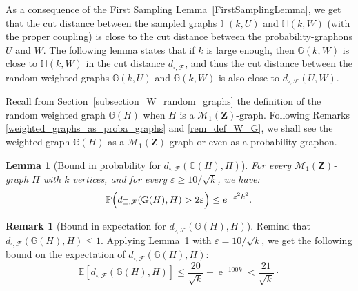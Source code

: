 \documentclass{amsart}
\theoremstyle{plain}
\newtheorem{lemme}[Th]{Lemma}
\theoremstyle{definition}
\newtheorem{remark}[Th]{Remark}
\newcommand{\Space}{\mathbf{Z}}
\newcommand{\Proba}{\mathcal{M}_1(\Space)}
\newcommand{\dcutF}{d_{\square,\mathcal{F}}}
\newcommand{\Prb}{\mathbb{P}}
\newcommand{\Esp}{\mathbb{E}}
\newcommand{\eps}{\varepsilon}
\DeclareMathOperator{\e}{e}
\begin{document}
As a consequence of the First Sampling Lemma~\ref{FirstSamplingLemma},
we get that the cut distance between the sampled graphs
$\mathbb{H}(k,U)$ and $\mathbb{H}(k,W)$
(with the proper coupling)
is close to the cut distance between the probability-graphons $U$ and $W$.
The following lemma states that if $k$ is large enough,
then $\mathbb{G}(k,W)$ is close to $\mathbb{H}(k,W)$
in the cut distance $\dcutF$,
and thus the cut distance between
the random weighted graphs
$\mathbb{G}(k,U)$ and $\mathbb{G}(k,W)$
is also close to $\dcutF(U,W)$.

Recall from Section~\ref{subsection_W_random_graphs} the definition of the random weighted graph 
	$\mathbb{G}(H)$ when $H$ is a $\Proba$-graph.
Following Remarks \ref{weighted_graphs_as_proba_graphs}
 and \ref{rem_def_W_G}, we shall see the weighted graph
$\mathbb{G}(H)$ as a $\Proba$-graph or even as a probability-graphon.

\begin{lemme}[Bound in probability for $\dcutF(\mathbb{G}(H),H)$]
	\label{lemma_graph_close}
For every $\Proba$-graph $H$ with $k$  vertices,
and for every $\eps \geq 10/\sqrt{k}$, we have:
\[ \Prb\Bigl(\dcutF(\mathbb{G}(H),H) > 2\eps\Bigr) \leq e^{-\eps^2k^2}  . \]
\end{lemme}


\begin{remark}[Bound in expectation for $\dcutF(\mathbb{G}(H),H)$]
	\label{graph_close_esp}
Remind that $\dcutF(\mathbb{G}(H), H) \leq 1$.
Applying Lemma~\ref{lemma_graph_close} with $\eps = 10 / \sqrt{k}$,
we get the following  bound on the expectation
of $\dcutF(\mathbb{G}(H),H)$:
\begin{equation*}
\Esp[\dcutF(\mathbb{G}(H),H)] \leq \frac{20}{\sqrt{k}} + \e^{-100 k} < \frac{21}{\sqrt{k}}  \cdot
\end{equation*}
\end{remark}
\end{document}
